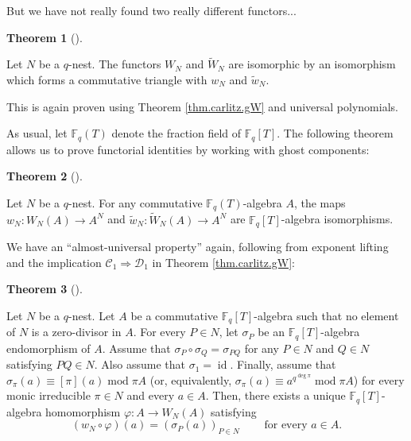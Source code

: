 \documentclass[numbers=enddot,12pt,final,onecolumn,notitlepage]{scrartcl}%
\theoremstyle{definition}
\newtheorem{theo}{Theorem}[section]
\newenvironment{theorem}[1][]
{\begin{theo}[#1]\begin{leftbar}}
{\end{leftbar}\end{theo}}
\begin{document}
But we have not really found two really different functors...

\begin{theorem}
\label{thm.carlitz.Witt.W=W}Let $N$ be a $q$-nest. The functors $W_{N}$ and
$\widetilde{W}_{N}$ are isomorphic by an isomorphism which forms a commutative
triangle with $w_{N}$ and $\widetilde{w}_{N}$.
\end{theorem}

This is again proven using Theorem \ref{thm.carlitz.gW} and universal polynomials.

As usual, let $\mathbb{F}_{q}\left(  T\right)  $ denote the fraction field of
$\mathbb{F}_{q}\left[  T\right]  $. The following theorem allows us to prove
functorial identities by working with ghost components:

\begin{theorem}
\label{thm.carlitz.Witt.iso}Let $N$ be a $q$-nest. For any commutative
$\mathbb{F}_{q}\left(  T\right)  $-algebra $A$, the maps $w_{N}:W_{N}\left(
A\right)  \rightarrow A^{N}$ and $\widetilde{w}_{N}:\widetilde{W}_{N}\left(
A\right)  \rightarrow A^{N}$ are $\mathbb{F}_{q}\left[  T\right]  $-algebra isomorphisms.
\end{theorem}

We have an ``almost-universal property'' again, following from exponent
lifting and the implication $\mathcal{C}_{1}\Longrightarrow\mathcal{D}_{1}$ in
Theorem \ref{thm.carlitz.gW}:

\begin{theorem}
\label{thm.carlitz.Witt.frob.au}Let $N$ be a $q$-nest. Let $A$ be a
commutative $\mathbb{F}_{q}\left[  T\right]  $-algebra such that no element of
$N$ is a zero-divisor in $A$. For every $P\in N$, let $\sigma_{P}$ be an
$\mathbb{F}_{q}\left[  T\right]  $-algebra endomorphism of $A$. Assume that
$\sigma_{P}\circ\sigma_{Q}=\sigma_{PQ}$ for any $P\in N$ and $Q\in N$
satisfying $PQ\in N$. Also assume that $\sigma_{1}=\operatorname*{id}$.
Finally, assume that $\sigma_{\pi}\left(  a\right)  \equiv\left[  \pi\right]
\left(  a\right)  \operatorname{mod}\pi A$ (or, equivalently, $\sigma_{\pi
}\left(  a\right)  \equiv a^{q^{\deg\pi}}\operatorname{mod}\pi A$) for every
monic irreducible $\pi\in N$ and every $a\in A$. Then, there exists a unique
$\mathbb{F}_{q}\left[  T\right]  $-algebra homomorphism $\varphi:A\rightarrow
W_{N}\left(  A\right)  $ satisfying%
\begin{equation}
\left(  w_{N}\circ\varphi\right)  \left(  a\right)  =\left(  \sigma_{P}\left(
a\right)  \right)  _{P\in N}\ \ \ \ \ \ \ \ \ \ \text{for every }a\in A.
\label{eq.thm.carlitz.Witt.frob.au.phi}%
\end{equation}

\end{theorem}
\end{document}
